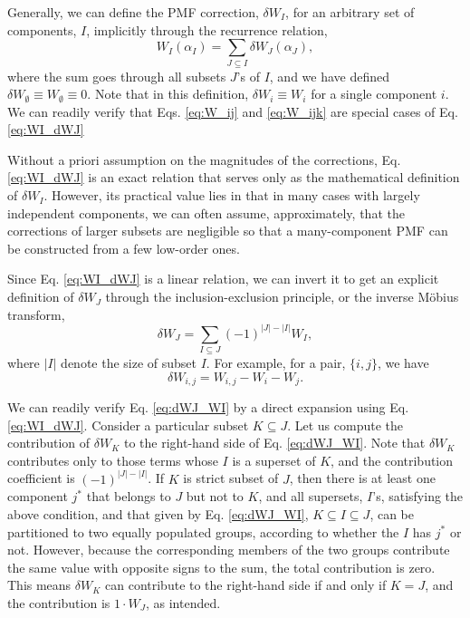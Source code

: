 \documentclass[preprint, superscriptaddress]{revtex4-1}
\begin{document}
Generally, we can define the PMF correction, $\delta W_I$,
for an arbitrary set of components, $I$,
implicitly through the recurrence relation,
%
\begin{equation}
  W_I(\alpha_I)
  =
  \sum_{J \subseteq I}
  \delta W_J(\alpha_J)
  ,
  \label{eq:WI_dWJ}
\end{equation}
%
where the sum goes through all subsets $J$'s of $I$,
and we have defined
$\delta W_\emptyset \equiv W_\emptyset \equiv 0$.
%
Note that in this definition,
$\delta W_i \equiv W_i$
for a single component $i$.
%
We can readily verify that
Eqs. \eqref{eq:W_ij} and \eqref{eq:W_ijk}
are special cases of Eq. \eqref{eq:WI_dWJ}

Without a priori assumption on the magnitudes of the corrections,
Eq. \eqref{eq:WI_dWJ} is an exact relation
that serves only as the mathematical definition of $\delta W_I$.
%
However, its practical value lies in that in many cases
with largely independent components,
we can often assume, approximately,
that the corrections of larger subsets are negligible
so that a many-component PMF can be constructed
from a few low-order ones.

Since Eq. \eqref{eq:WI_dWJ} is a linear relation,
we can invert it to get an explicit definition of $\delta W_J$
through the inclusion-exclusion principle, or the inverse M\"{o}bius transform\cite{bjorklund2007},
\begin{equation}
  \delta W_J =
  \sum_{I \subseteq J}
  (-1)^{|J| - |I|}
  W_I
  ,
  \label{eq:dWJ_WI}
\end{equation}
%
where $|I|$ denote the size of subset $I$.
%
For example, for a pair, $\{i, j\}$, we have
%
\begin{equation}
  \delta W_{i,j} = W_{i,j} - W_{i} - W_{j}
  .
  \label{eq:dWij}
\end{equation}

We can readily verify Eq. \eqref{eq:dWJ_WI}
by a direct expansion using Eq. \eqref{eq:WI_dWJ}.
%
Consider a particular subset $K \subseteq J$.
Let us compute the contribution of $\delta W_K$
to the right-hand side of Eq. \eqref{eq:dWJ_WI}.
%
Note that $\delta W_K$ contributes only to those terms
whose $I$ is a superset of $K$,
and the contribution coefficient is $(-1)^{|J|-|I|}$.
%
If $K$ is strict subset of $J$,
then there is at least one component $j^*$ that belongs to $J$
but not to $K$,
and all supersets, $I$'s,
satisfying the above condition, and that given by Eq. \eqref{eq:dWJ_WI},
$K \subseteq I \subseteq J$,
can be partitioned to two equally populated groups,
according to whether the $I$ has $j^*$ or not.
%
However, because the corresponding members of the two groups
contribute the same value with opposite signs to the sum,
the total contribution is zero.
%
This means $\delta W_K$ can contribute to the right-hand side
if and only if $K = J$, and the contribution is $1 \cdot W_J$,
as intended.
\end{document}
